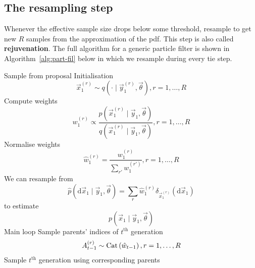 \subsection{The resampling step}
    Whenever the effective sample size drops below some threshold, resample to get new $R$ samples from the approximation of the pdf. This step is also called \textbf{rejuvenation}. The full algorithm for a generic particle filter is shown in Algorithm~\ref{alg:part-fil} below in which we resample during every tie step.
    \begin{algorithmbis}\label{alg:part-fil}
        \begin{algorithmic}[1]
            \State Sample from proposal \Comment Initialisation
                \begin{equation}
                    \vec x_1^{(r)} \sim q\left(\cdot \mid \vec y_1^{(r)}, \vec \theta\right), r = 1, \dotsc, R
                \end{equation}
            \State Compute weights
                \begin{equation}
                    w_1^{(r)} \propto \frac{p\left(\vec x_1^{(r)} \mid \vec y_1, \vec \theta\right)}{q\left(\vec x_1^{(r)} \mid \vec y_1, \vec \theta \right)}, r = 1, \dotsc, R
                \end{equation}
            \State Normalise weights
                \begin{equation}
                    \hat w_1^{(r)} = \frac{w_1^{(r)}}{\sum_{r'} w_1^{(r')}}, r = 1, \dotsc, R
                \end{equation}
            \State We can resample from 
                \begin{equation}
                    \hat p(\mathrm d \vec x_1 \mid \vec y_1, \vec \theta) = \sum_r \hat w_1^{(r)} \delta_{\vec x_1^{(r)}}(\mathrm d\vec x_1)
                \end{equation}
                to estimate
                \begin{equation}
                    p(\vec x_1 \mid \vec y_1, \vec \theta)
                \end{equation}
             \Comment Main loop
                \State Sample parents' indices of $t^{\text{th}}$ generation
                    \begin{equation}
                        A_{t - 1}^{(r)} \sim \operatorname{Cat}\left(\hat w_{t - 1}\right), r = 1, \dotsc, R
                    \end{equation}
                \State Sample $t^{\text{th}}$ generation using corresponding parents

\end{algorithmic}
\end{algorithmbis}
